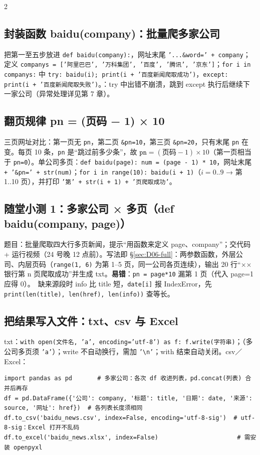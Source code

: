 \begin{multicols}{2}
\subsection{封装函数 baidu(company)：批量爬多家公司}
把第一至五步放进 \texttt{def baidu(company):}，网址末尾 \texttt{'...\&word=' + company}；定义 \texttt{companys = ['阿里巴巴', '万科集团', '百度', '腾讯', '京东']}；\texttt{for i in companys:} 中 \texttt{try: baidu(i); print(i + '百度新闻爬取成功')}，\texttt{except: print(i + '百度新闻爬取失败')}。：try 中出错不崩溃，跳到 except 执行后继续下一家公司（异常处理详见第 7 章）。

\subsection{翻页规律 pn = (页码 − 1) × 10}\label{sec:D06-pn}
三页网址对比：第一页无 \texttt{pn}，第二页 \texttt{\&pn=10}，第三页 \texttt{\&pn=20}，只有末尾 \texttt{pn} 在变。每页 10 条，\texttt{pn} 是“跳过前多少条”，故 \(\texttt{pn}=(\text{页码}-1)\times 10\)（第一页相当于 \texttt{pn=0}）。单公司多页：\texttt{def baidu(page): num = (page - 1) * 10}，网址末尾 \texttt{+ '\&pn=' + str(num)}；\texttt{for i in range(10): baidu(i + 1)}（$i=0..9$ → 第 1..10 页），并打印 \texttt{'第' + str(i + 1) + '页爬取成功'}。

\end{multicols}

\subsection{随堂小测 1：多家公司 × 多页（def baidu(company, page)）}\label{sec:D06-quiz1}
题目：批量爬取四大行多页新闻，提示“用函数来定义 page、company”；交代码 + 运行视频（24 号晚 12 点前）。写法即 §\ref{sec:D06-full}：两参数函数，外层公司、内层页码（\texttt{range(1, 6)} 为第 1–5 页，同一公司各页连续），输出 20 行“××银行第 n 页爬取成功”并生成 txt。\textbf{易错}：\texttt{pn = page*10} 漏第 1 页（代入 page=1 应得 0）。\tagext\ 缺来源段时 info 比 title 短，\texttt{date[i]} 报 IndexError，先 \texttt{print(len(title), len(href), len(info))} 查等长。

\subsection{把结果写入文件：txt、csv 与 Excel \texorpdfstring{\tagext}{（拓展）}}
txt：\texttt{with open(文件名, 'a', encoding='utf-8') as f: f.write(字符串)}；（多公司多页须 \texttt{'a'}）；write 不自动换行，需加 \texttt{'\textbackslash n'}；with 结束自动关闭。csv／Excel：
\begin{lstlisting}[style=pyD06]
import pandas as pd       # 多家公司：各次 df 收进列表，pd.concat(列表) 合并后再存
df = pd.DataFrame({'公司': company, '标题': title, '日期': date, '来源': source, '网址': href})  # 各列表长度须相同
df.to_csv('baidu_news.csv', index=False, encoding='utf-8-sig')  # utf-8-sig：Excel 打开不乱码
df.to_excel('baidu_news.xlsx', index=False)                      # 需安装 openpyxl
\end{lstlisting}

